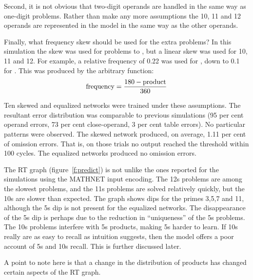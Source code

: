 Second, it is not obvious that two-digit operands are handled in the same
way as one-digit problems.  Rather than make any more assumptions the 10,
11 and 12 operands are represented in the model in the same way as the
other operands.

Finally, what frequency skew should be used for the extra problems? In this
simulation the \citeauthor{siegmult} skew was used for problems  to
, but a linear skew was used for 10, 11 and 12.
For example, a relative frequency of 0.22 was used for
, down to 0.1 for .  This was produced by the arbitrary
function:
$$ {\rm frequency} = \frac{180-{\rm product}}{360} $$

Ten skewed and equalized networks were trained under these assumptions. The
resultant error distribution was comparable to previous simulations (95 per
cent operand errors, 73 per cent close-operand, 3 per cent table errors).
No particular patterns were observed. The skewed network produced, on
average, 1.11 per cent of omission errors.  That is, on those trials no
output reached the threshold within 100 cycles.  The equalized networks
produced no omission errors.


The RT graph (figure~\ref{f:predict}) is not unlike the ones reported for
the simulations using the MATHNET input encoding.  The 12s problems are
among the slowest problems, and the 11s problems are solved relatively
quickly, but the 10s are slower than expected.  The graph shows dips for
the primes 3,5,7 and 11, although the 5s dip is not present for the
equalized networks. The disappearance of the 5s dip is perhaps due to the
reduction in ``uniqueness'' of the 5s problems.  The 10s problems interfere
with 5s products, making 5s harder to learn. If 10s really are as easy to
recall as intuition suggests, then the model offers a poor account of 5s
and 10s recall.  This is further discussed later.

A point to note here is that a change in the distribution of products has
changed certain aspects of the RT graph.



%

